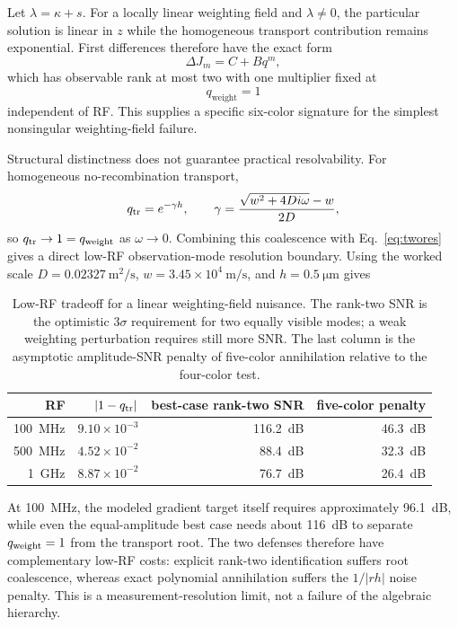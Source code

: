 \documentclass[11pt]{article}
\begin{document}
Let $\lambda=\kappa+s$. For a locally linear weighting field and $\lambda\neq0$, the particular solution is linear in $z$ while the homogeneous transport contribution remains exponential. First differences therefore have the exact form
\begin{equation}
\boxed{\Delta J_m=C+Bq^m,}
\label{eq:weighting_rank2}
\end{equation}
which has observable rank at most two with one multiplier fixed at
\begin{equation}
\boxed{q_{\mathrm{weight}}=1}
\end{equation}
independent of RF. This supplies a specific six-color signature for the simplest nonsingular weighting-field failure.

Structural distinctness does not guarantee practical resolvability. For homogeneous no-recombination transport,
\begin{equation}
q_{\rm tr}=e^{-\gamma h},\qquad
\gamma=\frac{\sqrt{w^2+4Di\omega}-w}{2D},
\end{equation}
so $q_{\rm tr}\to1=q_{\rm weight}$ as $\omega\to0$. Combining this coalescence with Eq.~\eqref{eq:twores} gives a direct low-RF observation-mode resolution boundary. Using the worked scale $D=0.02327~\mathrm{m^2/s}$, $w=3.45\times10^4~\mathrm{m/s}$, and $h=0.5~\si{\micro\meter}$ gives
\begin{table}[H]
\centering
\caption{Low-RF tradeoff for a linear weighting-field nuisance. The rank-two SNR is the optimistic $3\sigma$ requirement for two equally visible modes; a weak weighting perturbation requires still more SNR. The last column is the asymptotic amplitude-SNR penalty of five-color annihilation relative to the four-color test.}
\label{tab:weighting_coalescence}
\begin{tabular}{rrrr}
\toprule
RF & $|1-q_{\rm tr}|$ & best-case rank-two SNR & five-color penalty \\
\midrule
\SI{100}{MHz} & $9.10\times10^{-3}$ & \SI{116.2}{dB} & \SI{46.3}{dB} \\
\SI{500}{MHz} & $4.52\times10^{-2}$ & \SI{88.4}{dB} & \SI{32.3}{dB} \\
\SI{1}{GHz} & $8.87\times10^{-2}$ & \SI{76.7}{dB} & \SI{26.4}{dB} \\
\bottomrule
\end{tabular}
\end{table}
At \SI{100}{MHz}, the modeled gradient target itself requires approximately \SI{96.1}{dB}, while even the equal-amplitude best case needs about \SI{116}{dB} to separate $q_{\rm weight}=1$ from the transport root. The two defenses therefore have complementary low-RF costs: explicit rank-two identification suffers root coalescence, whereas exact polynomial annihilation suffers the $1/|rh|$ noise penalty. This is a measurement-resolution limit, not a failure of the algebraic hierarchy.
\end{document}

